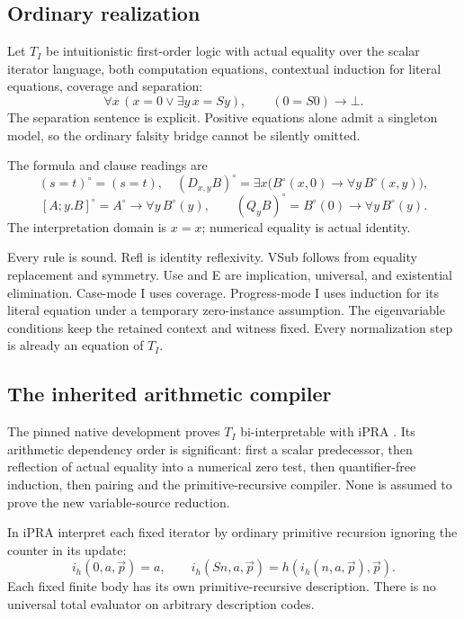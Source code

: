 \subsection{Ordinary realization}

Let $T_I$ be intuitionistic first-order logic with actual equality over
the scalar iterator language, both computation equations, contextual
induction for literal equations, coverage and separation:
\[
 \forall x\,(x=0\lor\exists y\,x=Sy),\qquad
 (0=S0)\to\bot.
\]
The separation sentence is explicit. Positive equations alone admit a
singleton model, so the ordinary falsity bridge cannot be silently omitted.

The formula and clause readings are
\[
 (s=t)^\circ=(s=t),\quad
 (D_{x,y}B)^\circ=\exists x\bigl(B^\circ(x,0)\to\forall y\,B^\circ(x,y)\bigr),
\]
\[
 [A;y.B]^\circ=A^\circ\to\forall y\,B^\circ(y),\qquad
 (Q_yB)^\circ=B^\circ(0)\to\forall y\,B^\circ(y).
\]
The interpretation domain is $x=x$; numerical equality is actual identity.

Every rule is sound. Refl is identity reflexivity. VSub follows from
equality replacement and symmetry. Use and E are implication, universal,
and existential elimination. Case-mode I uses coverage. Progress-mode I
uses induction for its literal equation under a temporary zero-instance
assumption. The eigenvariable conditions keep the retained context and
witness fixed. Every normalization step is already an equation of $T_I$.

\subsection{The inherited arithmetic compiler}

The pinned native development proves $T_I$ bi-interpretable with iPRA
\cite{repo,bridge}. Its arithmetic dependency order is significant:
first a scalar predecessor, then reflection of actual equality into a
numerical zero test, then quantifier-free induction, then pairing and
the primitive-recursive compiler. None is assumed to prove the new
variable-source reduction.

In iPRA interpret each fixed iterator by ordinary primitive recursion
ignoring the counter in its update:
\[
 i_h(0,a,\vec p)=a,\qquad
 i_h(Sn,a,\vec p)=h(i_h(n,a,\vec p),\vec p).
\]
Each fixed finite body has its own primitive-recursive description.
There is no universal total evaluator on arbitrary description codes.

